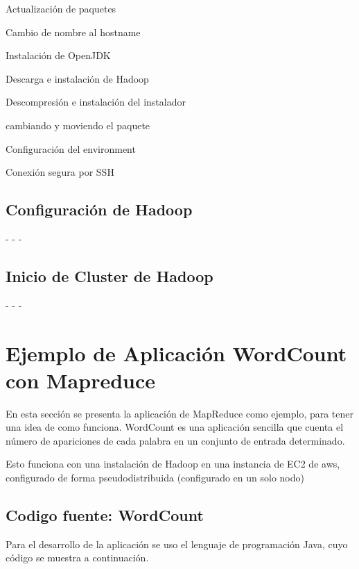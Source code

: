 Actualización de paquetes


Cambio de nombre al hostname

Instalación de OpenJDK


Descarga e instalación de Hadoop


Descompresión e instalación del instalador

cambiando y moviendo el paquete

Configuración del environment

Conexión segura por SSH

 

\subsection{Configuración de Hadoop}


-
-
-

\subsection{Inicio de Cluster de Hadoop}

-
-
-




\clearpage

\section{Ejemplo de Aplicación WordCount con Mapreduce}
\justify
En esta sección se presenta la aplicación de MapReduce como ejemplo, para tener una idea de como funciona.
WordCount es una aplicación sencilla que cuenta el número de apariciones de cada palabra en un conjunto de entrada determinado.

Esto funciona con una instalación de Hadoop en una instancia de EC2 de aws, configurado de forma pseudodistribuida (configurado en un solo nodo) 
 
 
 \subsection{Codigo fuente: WordCount}
 
 Para el desarrollo de la aplicación se uso el lenguaje de programación Java, cuyo código se muestra a continuación.

